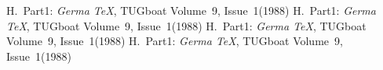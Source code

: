 \documentclass[a4paper,11pt]{article}
\begin{document}
\begin{thebibliography}{99}
     H.~Part1: \emph{Germa \TeX}, TUGboat Volume~9, Issue~1(1988) 
     H.~Part1: \emph{Germa \TeX}, TUGboat Volume~9, Issue~1(1988) 
     H.~Part1: \emph{Germa \TeX}, TUGboat Volume~9, Issue~1(1988) 
     H.~Part1: \emph{Germa \TeX}, TUGboat Volume~9, Issue~1(1988) 
\end{thebibliography}
\end{document}
